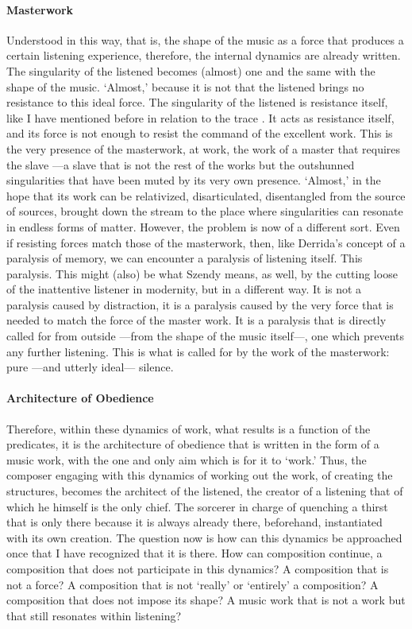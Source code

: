 \paragraph{Masterwork}
Understood in this way, that is, the shape of the music as a force that produces a certain listening experience, therefore, the internal dynamics are already written. The singularity of the listened becomes (almost) one and the same with the shape of the music. `Almost,' because it is not that the listened brings no resistance to this ideal force. The singularity of the listened is resistance itself, like I have mentioned before in relation to the trace . It acts as resistance itself, and its force is not enough to resist the command of the excellent work. This is the very presence of the masterwork, at work, the work of a master that requires the slave ---a slave that is not the rest of the works but the outshunned singularities that have been muted by its very own presence. `Almost,' in the hope that its work can be relativized, disarticulated, disentangled from the source of sources, brought down the stream to the place where singularities can resonate in endless forms of matter. However, the problem is now of a different sort. Even if resisting forces match those of the masterwork, then, like Derrida's concept of a paralysis of memory, we can encounter a paralysis of listening itself. This paralysis. This might (also) be what Szendy means, as well, by the cutting loose of the inattentive listener in modernity, but in a different way. It is not a paralysis caused by distraction, it is a paralysis caused by the very force that is needed to match the force of the master work. It is a paralysis that is directly called for from outside ---from the shape of the music itself---, one which prevents any further listening. This is what is called for by the work of the masterwork: pure ---and utterly ideal--- silence.

\paragraph{Architecture of Obedience}
Therefore, within these dynamics of work, what results is a function of the predicates, it is the architecture of obedience that is written in the form of a music work, with the one and only aim which is for it to `work.' Thus, the composer engaging with this dynamics of working out the work, of creating the structures, becomes the architect of the listened, the creator of a listening that of which he himself is the only chief. The sorcerer in charge of quenching a thirst that is only there because it is always already there, beforehand, instantiated with its own creation. The question now is how can this dynamics be approached once that I have recognized that it is there. How can composition continue, a composition that does not participate in this dynamics? A composition that is not a force? A composition that is not `really' or `entirely' a composition? A composition that does not impose its shape? A music work that is not a work but that still resonates within listening?


